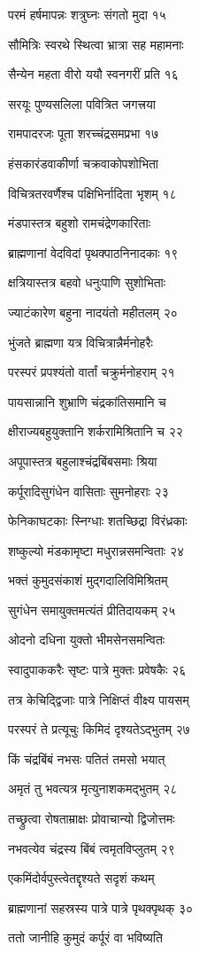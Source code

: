 परमं हर्षमापन्नः शत्रुघ्नः संगतो मुदा १५

सौमित्रिः स्वरथे स्थित्वा भ्रात्रा सह महामनाः

सैन्येन महता वीरो ययौ स्वनगरीं प्रति १६

सरयूः पुण्यसलिला पवित्रित जगत्त्रया

रामपादरजः पूता शरच्चंद्रसमप्रभा १७

हंसकारंडवाकीर्णा चक्रवाकोपशोभिता

विचित्रतरवर्णैश्च पक्षिभिर्नादिता भृशम् १८

मंडपास्तत्र बहुशो रामचंद्रेणकारिताः

ब्राह्मणानां वेदविदां पृथक्पाठनिनादकाः १९

क्षत्रियास्तत्र बहवो धनुःपाणि सुशोभिताः

ज्याटंकारेण बहुना नादयंतो महीतलम् २०

भुंजते ब्राह्मणा यत्र विचित्रान्नैर्मनोहरैः

परस्परं प्रपश्यंतो वार्तां चक्रुर्मनोहराम् २१

पायसान्नानि शुभ्राणि चंद्रकांतिसमानि च

क्षीराज्यबहुयुक्तानि शर्करामिश्रितानि च २२

अपूपास्तत्र बहुलाश्चंद्रबिंबसमाः श्रिया

कर्पूरादिसुगंधेन वासिताः सुमनोहराः २३

फेनिकाघटकाः स्निग्धाः शतच्छिद्रा विरंध्रकाः

शष्कुल्यो मंडकामृष्टा मधुरान्नसमन्विताः २४

भक्तं कुमुदसंकाशं मुद्गदालिविमिश्रितम्

सुगंधेन समायुक्तमत्यंतं प्रीतिदायकम् २५

ओदनो दधिना युक्तो भीमसेनसमन्वितः

स्वादुपाककरैः सृष्टः पात्रे मुक्तः प्रवेषकैः २६

तत्र केचिद्द्विजाः पात्रे निक्षिप्तं वीक्ष्य पायसम्

परस्परं ते प्रत्यूचुः किमिदं दृश्यतेऽद्भुतम् २७

किं चंद्रबिंबं नभसः पतितं तमसो भयात्

अमृतं तु भवत्यत्र मृत्युनाशकमद्भुतम् २८

तच्छ्रुत्वा रोषताम्राक्षः प्रोवाचान्यो द्विजोत्तमः

नभवत्येव चंद्रस्य बिंबं त्वमृतविप्लुतम् २९

एकमिंदोर्वपुस्त्वेतद्दृश्यते सदृशं कथम्

ब्राह्मणानां सहस्रस्य पात्रे पात्रे पृथक्पृथक् ३०

ततो जानीहि कुमुदं कर्पूरं वा भविष्यति

